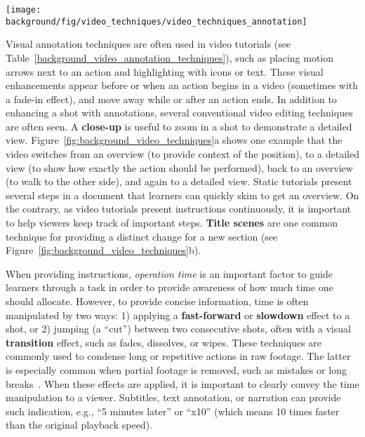 \begin{table*}[!b]
  \centering
  \texttt{[image: \\background/fig/video\_techniques/video\_techniques\_annotation]}
  \begin{minipage}{\textwidth}
  \caption[Example annotation techniques used in a video tutorial.]{
    Example annotation techniques used in a video tutorial\footnote{``How to use Loola 3 stroller'' by Maxi-Cosi, \url{https://youtu.be/p6MzLXeWBJw}, licensed under CC BY 2.0}.
  }
  \label{background_video_annotation_techniques}
  \end{minipage}
\end{table*}

Visual annotation techniques are often used in video tutorials (see Table~\ref{background_video_annotation_techniques}), such as placing motion arrows next to an action and highlighting with icons or text. These visual enhancements appear before or when an action begins in a video (sometimes with a fade-in effect), and move away while or after an action ends.
%
In addition to enhancing a shot with annotations, several conventional video editing techniques are often seen. A \textbf{close-up} is useful to zoom in a shot to demonstrate a detailed view. Figure~\ref{fig:background_video_techniques}a shows one example that the video switches from an overview (to provide context of the position), to a detailed view (to show how exactly the action should be performed), back to an overview (to walk to the other side), and again to a detailed view.
%
Static tutorials present several steps in a document that learners can quickly skim to get an overview. On the contrary, as video tutorials present instructions continuously, it is important to help viewers keep track of important steps. \textbf{Title scenes} are one common technique for providing a distinct change for a new section (see Figure~\ref{fig:background_video_techniques}b).


When providing instructions, \emph{operation time} is an important factor to guide learners through a task in order to provide awareness of how much time one should allocate.
%
However, to provide concise information, time is often manipulated by two ways: 1) applying a \textbf{fast-forward} or \textbf{slowdown} effect to a shot, or 2) jumping (a ``cut'') between two consecutive shots, often with a visual \textbf{transition} effect, such as fades, dissolves, or wipes. These techniques are commonly used to condense long or repetitive actions in raw footage. The latter is especially common when partial footage is removed, such as mistakes or long breaks~\cite{Tseng:2014:PVP:2598510.2598540}.
%
When these effects are applied, it is important to clearly convey the time manipulation to a viewer. Subtitles, text annotation, or narration can provide such indication, e.g., ``5 minutes later'' or ``x10'' (which means 10 times faster than the original playback speed).

